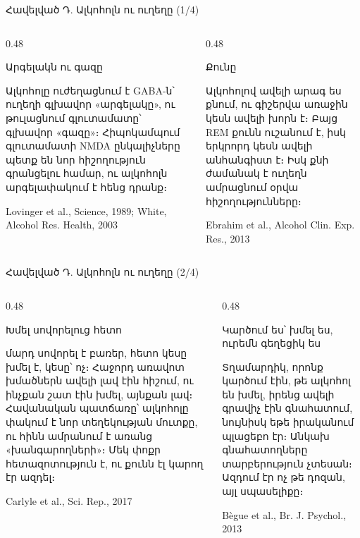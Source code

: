\newcommand{\alccard}[4]{%
  \begin{card}[colback=#1!35!cardwhite, fontupper=\footnotesize]
    {\blackfont\small #2}\par\smallskip
    #3\par\smallskip
    {\color{plum!65}#4}
  \end{card}}

\begin{frame}{Հավելված Դ. Ալկոհոլն ու ուղեղը (1/4)}
  \begin{columns}[T]
    \begin{column}{0.48\textwidth}
      \alccard{mint}{Արգելակն ու գազը}{Ալկոհոլը ուժեղացնում է GABA-ն՝ ուղեղի գլխավոր «արգելակը», ու թուլացնում գլուտամատը՝ գլխավոր «գազը»։ Հիպոկամպում գլուտամատի NMDA ընկալիչները պետք են նոր հիշողություն գրանցելու համար, ու ալկոհոլն արգելափակում է հենց դրանք։}{Lovinger et al., Science, 1989; White, Alcohol Res. Health, 2003}
    \end{column}
    \begin{column}{0.48\textwidth}
      \alccard{butter}{Քունը}{Ալկոհոլով ավելի արագ ես քնում, ու գիշերվա առաջին կեսն ավելի խորն է։ Բայց REM քունն ուշանում է, իսկ երկրորդ կեսն ավելի անհանգիստ է։ Իսկ քնի ժամանակ է ուղեղն ամրացնում օրվա հիշողությունները։}{Ebrahim et al., Alcohol Clin. Exp. Res., 2013}
    \end{column}
  \end{columns}
\end{frame}

\begin{frame}{Հավելված Դ. Ալկոհոլն ու ուղեղը (2/4)}
  \begin{columns}[T]
    \begin{column}{0.48\textwidth}
      \alccard{lavender}{Խմել սովորելուց հետո}{88 մարդ սովորել է բառեր, հետո կեսը խմել է, կեսը՝ ոչ։ Հաջորդ առավոտ խմածներն ավելի լավ էին հիշում, ու ինչքան շատ էին խմել, այնքան լավ։ Հավանական պատճառը՝ ալկոհոլը փակում է նոր տեղեկության մուտքը, ու հինն ամրանում է առանց «խանգարողների»։ Մեկ փոքր հետազոտություն է, ու քունն էլ կարող էր ազդել։}{Carlyle et al., Sci. Rep., 2017}
    \end{column}
    \begin{column}{0.48\textwidth}
      \alccard{peach}{Կարծում ես՝ խմել ես, ուրեմն գեղեցիկ ես}{Տղամարդիկ, որոնք կարծում էին, թե ալկոհոլ են խմել, իրենց ավելի գրավիչ էին գնահատում, նույնիսկ եթե իրականում պլացեբո էր։ Անկախ գնահատողները տարբերություն չտեսան։ Ազդում էր ոչ թե դոզան, այլ սպասելիքը։}{Bègue et al., Br. J. Psychol., 2013}
    \end{column}
  \end{columns}
\end{frame}

